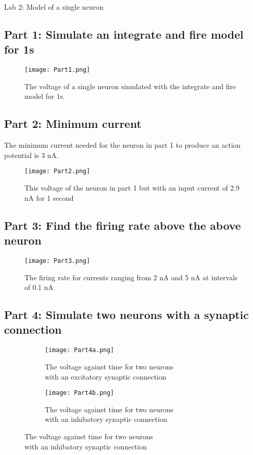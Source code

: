 \documentclass[a4paper, 12pt]{article}
\begin{document}
\begingroup
  \centering
  \LARGE Lab 2: Model of a single neuron
\endgroup

\subsection*{Part 1: Simulate an integrate and fire model for 1s}
\begin{figure}[H]
  \centering
  \texttt{[image: Part1.png]}
  \caption{The voltage of a single neuron simulated with the integrate and fire model for 1s.}
\end{figure}

\subsection*{Part 2: Minimum current}

The minimum current needed for the neuron in part 1 to produce an action potential is 3 nA.

\begin{figure}[H]
  \centering
  \texttt{[image: Part2.png]}
  \caption{This voltage of the neuron in part 1 but with an input current of 2.9 nA for 1 second}
\end{figure}

\subsection*{Part 3: Find the firing rate above the above neuron}

\begin{figure}[H]
  \centering
  \texttt{[image: Part3.png]}
  \caption{The firing rate for currents ranging from 2 nA and 5 nA at intervals of 0.1 nA}
\end{figure}

\subsection*{Part 4: Simulate two neurons with a synaptic connection}
\begin{figure}[H]
  \centering
  \begin{subfigure}{.5\textwidth}
    \centering
    \texttt{[image: Part4a.png]}
    \caption{The voltage against time for two neurons 
      \\with an excitatory synaptic connection}
    \label{fig:sub1}
  \end{subfigure}%
  \begin{subfigure}{.5\textwidth}
    \centering
    \texttt{[image: Part4b.png]}
    \caption{The voltage against time for two neurons 
      \\with an inhibatory synaptic connection}
    \label{fig:sub2}
  \end{subfigure}
\end{figure}
\end{document}
